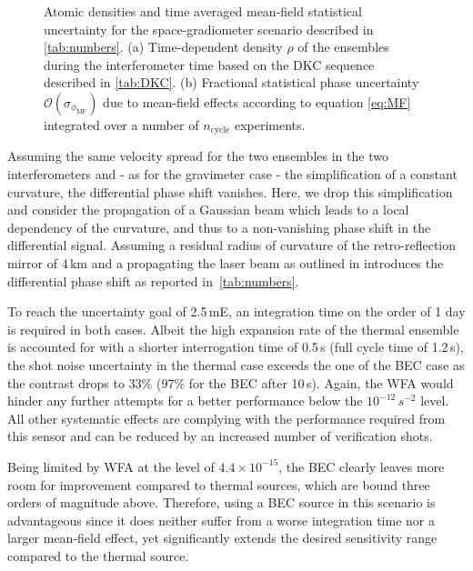 \begin{figure}[h!]
    \centering
    \caption{Atomic densities and time averaged mean-field statistical uncertainty for the space-gradiometer scenario described in \autoref{tab:numbers}. (a) Time-dependent density $\rho$ of the ensembles during the interferometer time based on the DKC sequence described in \autoref{tab:DKC}. (b) Fractional statistical phase uncertainty $\mathcal{O}(\sigma_{\phi_\text{MF}})$ due to mean-field effects according to equation \autoref{eq:MF} integrated over a number of $n_\text{cycle}$ experiments. }
    \label{fig:MF-effects}
\end{figure}

Assuming the same velocity spread for the two ensembles in the two interferometers and - as for the gravimeter case - the simplification of a constant curvature, the differential phase shift vanishes. Here, we drop this simplification and consider the propagation of a Gaussian beam which leads to a local dependency of the curvature, and thus to a non-vanishing phase shift in the differential signal. Assuming a residual radius of curvature of the retro-reflection mirror of 4\,km and a propagating the laser beam as outlined in \cite{Trimeche2019} introduces the differential phase shift as reported in~\autoref{tab:numbers}.
 
To reach the uncertainty goal of 2.5\,mE, an integration time on the order of 1 day is required in both cases. Albeit the high expansion rate of the thermal ensemble is accounted for with a shorter interrogation time of 0.5\,s (full cycle time of 1.2\,s), the shot noise uncertainty in the thermal case exceeds the one of the BEC case as the contrast drops to 33\% (97\% for the BEC after 10\,s).
Again, the WFA would hinder any further attempts for a better performance below the $10^{-12}\,s^{-2}$ level. All other systematic effects are complying with the performance required from this sensor and can be reduced by an increased number of verification shots. 

Being limited by WFA at the level of $4.4\times10^{-15}$, the BEC clearly leaves more room for improvement compared to thermal sources, which are bound three orders of magnitude above. Therefore, using a BEC source in this scenario is advantageous since it does neither suffer from a worse integration time nor a larger mean-field effect, yet significantly extends the desired sensitivity range compared to the thermal source.

